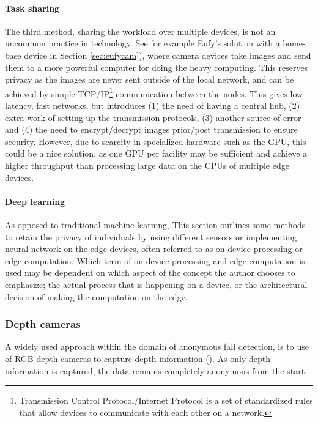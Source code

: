 \paragraph{Task sharing}
The third method, sharing the workload over multiple devices, is not an uncommon practice in technology. See for example Eufy's solution with a home-base device in Section \ref{sec:eufycam}), where camera devices take images and send them to a more powerful computer for doing the heavy computing. This reserves privacy as the images are never sent outside of the local network, and can be achieved by simple TCP/IP\footnote{Transmission Control Protocol/Internet Protocol is a set of standardized rules that allow devices to communicate with each other on a network.} communication between the nodes. This gives low latency, fast networks, but introduces (1) the need of having a central hub, (2) extra work of setting up the transmission protocols, (3) another source of error and (4) the need to encrypt/decrypt images prior/post transmission to ensure security. However, due to scarcity in specialized hardware such as the GPU, this could be a nice solution, as one GPU per facility may be sufficient and achieve a higher throughput than processing large data on the CPUs of multiple edge devices.

\paragraph{Deep learning}
As opposed to traditional machine learning,
This section outlines some methods to retain the privacy of individuals by using different sensors or implementing neural network on the edge devices, often referred to as on-device processing or edge computation. Which term of on-device processing and edge computation is used may be dependent on which aspect of the concept the author chooses to emphasize; the actual process that is happening on a device, or the architectural decision of making the computation on the edge.

\subsubsection{Depth cameras}
A widely used approach within the domain of anonymous fall detection, is to use of RGB depth cameras to capture depth information (\cite{wa2020elderly_fall_detection_meta}). As only depth information is captured, the data remains completely anonymous from the start.


